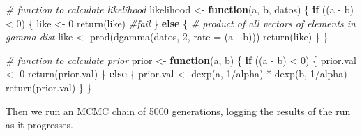 \documentclass[
]{article}
\newenvironment{Shaded}{\begin{snugshade}}{\end{snugshade}}
\newcommand{\AttributeTok}[1]{\textcolor[rgb]{0.77,0.63,0.00}{#1}}
\newcommand{\CommentTok}[1]{\textcolor[rgb]{0.56,0.35,0.01}{\textit{#1}}}
\newcommand{\ControlFlowTok}[1]{\textcolor[rgb]{0.13,0.29,0.53}{\textbf{#1}}}
\newcommand{\DecValTok}[1]{\textcolor[rgb]{0.00,0.00,0.81}{#1}}
\newcommand{\FunctionTok}[1]{\textcolor[rgb]{0.00,0.00,0.00}{#1}}
\newcommand{\NormalTok}[1]{#1}
\newcommand{\OtherTok}[1]{\textcolor[rgb]{0.56,0.35,0.01}{#1}}
\newcommand{\SpecialCharTok}[1]{\textcolor[rgb]{0.00,0.00,0.00}{#1}}
\begin{document}
\begin{Shaded}
\begin{Highlighting}[]
\CommentTok{\# function to calculate likelihood}
\NormalTok{likelihood }\OtherTok{\textless{}{-}} \ControlFlowTok{function}\NormalTok{(a, b, datos) \{}
    \ControlFlowTok{if}\NormalTok{ ((a }\SpecialCharTok{{-}}\NormalTok{ b) }\SpecialCharTok{\textless{}} \DecValTok{0}\NormalTok{) \{}
\NormalTok{        like }\OtherTok{\textless{}{-}} \DecValTok{0}
        \FunctionTok{return}\NormalTok{(like)  }\CommentTok{\#fail}
\NormalTok{    \} }\ControlFlowTok{else}\NormalTok{ \{}
        \CommentTok{\# product of all vectors of elements in gamma dist}
\NormalTok{        like }\OtherTok{\textless{}{-}} \FunctionTok{prod}\NormalTok{(}\FunctionTok{dgamma}\NormalTok{(datos, }\DecValTok{2}\NormalTok{, }\AttributeTok{rate =}\NormalTok{ (a }\SpecialCharTok{{-}}\NormalTok{ b)))}
        \FunctionTok{return}\NormalTok{(like)}
\NormalTok{    \}}
\NormalTok{\}}

\CommentTok{\# function to calculate prior}
\NormalTok{prior }\OtherTok{\textless{}{-}} \ControlFlowTok{function}\NormalTok{(a, b) \{}
    \ControlFlowTok{if}\NormalTok{ ((a }\SpecialCharTok{{-}}\NormalTok{ b) }\SpecialCharTok{\textless{}} \DecValTok{0}\NormalTok{) \{}
\NormalTok{        prior.val }\OtherTok{\textless{}{-}} \DecValTok{0}
        \FunctionTok{return}\NormalTok{(prior.val)}
\NormalTok{    \} }\ControlFlowTok{else}\NormalTok{ \{}
\NormalTok{        prior.val }\OtherTok{\textless{}{-}} \FunctionTok{dexp}\NormalTok{(a, }\DecValTok{1}\SpecialCharTok{/}\NormalTok{alpha) }\SpecialCharTok{*} \FunctionTok{dexp}\NormalTok{(b, }\DecValTok{1}\SpecialCharTok{/}\NormalTok{alpha)}
        \FunctionTok{return}\NormalTok{(prior.val)}
\NormalTok{    \}}
\NormalTok{\}}
\end{Highlighting}
\end{Shaded}

Then we run an MCMC chain of 5000 generations, logging the results of
the run as it progresses.
\end{document}
